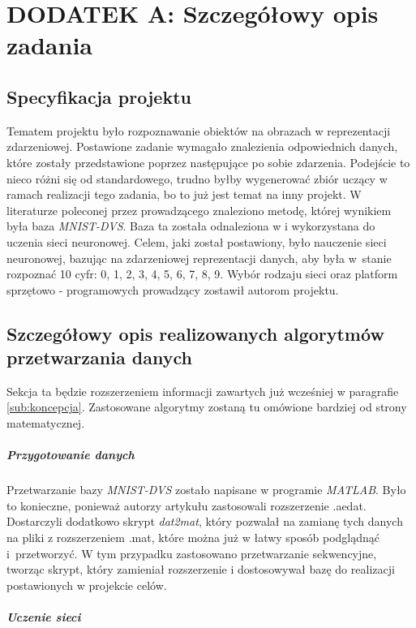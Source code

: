 \section{DODATEK A: Szczegółowy opis zadania}
\label{sub:dodatekA}

\subsection{Specyfikacja projektu}
\label{sub:specyfikacja}

Tematem projektu było rozpoznawanie obiektów na obrazach w reprezentacji zdarzeniowej. Postawione zadanie wymagało znalezienia odpowiednich danych, które zostały przedstawione poprzez następujące po sobie zdarzenia. Podejście to nieco różni się od standardowego, trudno byłby wygenerować zbiór uczący  w ramach realizacji tego zadania, bo to już jest temat na inny projekt. W literaturze poleconej przez prowadzącego znaleziono metodę, której wynikiem była baza \textit{MNIST-DVS}. Baza ta została odnaleziona w \cite{baza} i wykorzystana do uczenia sieci neuronowej. Celem, jaki został postawiony, było nauczenie sieci neuronowej, bazując na zdarzeniowej reprezentacji danych, aby była w~stanie rozpoznać 10 cyfr: 0, 1, 2, 3, 4, 5, 6, 7, 8, 9. Wybór rodzaju sieci oraz platform sprzętowo - programowych prowadzący zostawił autorom projektu. 

\subsection{Szczegółowy opis realizowanych algorytmów przetwarzania danych}
\label{sub:opis}

Sekcja ta będzie rozszerzeniem informacji zawartych już wcześniej w paragrafie \ref{sub:koncepcja}. Zastosowane algorytmy zostaną tu omówione bardziej od strony matematycznej.

\subparagraph{Przygotowanie danych}
\label{sub:przyg}

Przetwarzanie bazy \textit{MNIST-DVS} zostało napisane w programie \textit{MATLAB}. Było to konieczne, ponieważ autorzy artykułu \cite{MNIST_DVS} zastosowali rozszerzenie .aedat. Dostarczyli dodatkowo skrypt \textit{dat2mat}, który pozwalał na zamianę tych danych na pliki z rozszerzeniem .mat, które można już w łatwy sposób podglądnąć i~przetworzyć. W tym przypadku zastosowano przetwarzanie sekwencyjne, tworząc skrypt, który zamieniał rozszerzenie i dostosowywał bazę do realizacji postawionych w projekcie celów.

\subparagraph{Uczenie sieci}
\label{sub:ucz}


